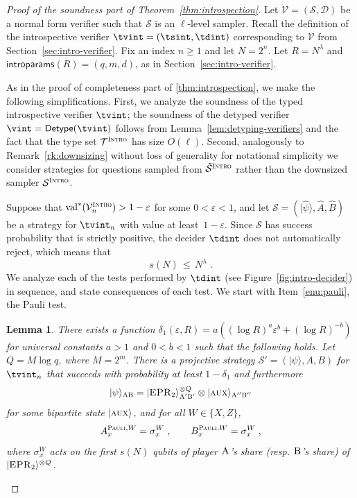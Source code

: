 \documentclass[11pt]{article}
\newtheorem{lemma}[theorem]{Lemma}
\theoremstyle{definition}
\newcommand{\ket}[1]{|#1\rangle}
\newcommand{\val}{\ensuremath{\mathrm{val}}}
\newcommand{\eps}{\varepsilon}
\newcommand{\sampler}{\mathcal{S}}
\newcommand{\decider}{\mathcal{D}}
\newcommand{\verifier}{\mathcal{V}}
\newcommand{\strategy}{\mathscr{S}}
\newcommand{\type}{\mathcal{T}}
\newcommand{\gamestyle}[1]{\ensuremath{\textsc{#1}}\xspace}
\newcommand{\intro}{\gamestyle{Intro}}
\newcommand{\labelstyle}[1]{\ensuremath{\textsc{#1}}\xspace}
\newcommand{\EPR}{\labelstyle{EPR}}
\newcommand{\aux}{\labelstyle{aux}}
\newcommand{\alice}{\labelstyle{A}}
\newcommand{\bob}{\labelstyle{B}}
\newcommand{\typestyle}[1]{\ensuremath{\textsc{#1}}\xspace}
\newcommand{\Pauli}{\typestyle{Pauli}}
\newcommand{\introparams}{\mathsf{introparams}}
\newcommand{\tmstyle}[1]{\ensuremath{\mathsf{#1}}}
\newcommand{\detype}{\tmstyle{Detype}}
\begin{document}
\begin{proof}[Proof of the soundness part of Theorem~\ref{thm:introspection}]
  Let $\verifier=(\sampler, \decider)$ be a normal form verifier such that
  $\sampler$ is an $\ell$-level sampler.
  Recall the definition of the introspective verifier $\tvint =
  (\tsint, \tdint)$ corresponding to $\verifier$ from
  Section~\ref{sec:intro-verifier}.
  Fix an index $n\geq 1$ and let $N = 2^n$.
  Let $R = N^\lambda$ and $\introparams(R) = (q,m,d)$,
  as in Section~\ref{sec:intro-verifier}.
 
  As in the proof of completeness part of \cref{thm:introspection}, we make the
  following simplifications.
  First, we analyze the soundness of the typed introspective verifier
  $\tvint$; the soundness of the detyped verifier
  $\vint = \detype(\tvint)$ follows from Lemma~\ref{lem:detyping-verifiers}
  and the fact that the type set $\type^\intro$ has size $O(\ell)$.
  Second, analogously to Remark~\ref{rk:downsizing} without loss of generality
  for notational simplicity we consider strategies for questions sampled from
  $\tilde{\sampler}^\intro$ rather than the downsized sampler
  ${\sampler}^\intro$.

  Suppose that $\val^*(\verifier_n^\intro) > 1-\eps$ for some $0 < \eps < 1$,
  and let $\strategy = (\ket{\hat{\psi}}, \hat{A}, \hat{B})$ be a strategy for
  $\tvint_n$ with value at least~$1-\eps$.
  Since $\strategy$ has success probability that is strictly positive, the
  decider $\tdint$ does not automatically reject, which means that
	\begin{equation}\label{eq:intro-sound-lambda}
	s(N) \,\leq\, N^\lambda\;.
	\end{equation}
	We analyze each of the tests performed by $\tdint$ (see
  Figure~\ref{fig:intro-decider}) in sequence, and state consequences of each
  test.
  We start with Item~\ref{enu:pauli}, the Pauli test.
	
  \begin{lemma}\label{lem:intro-pauli-strat}
    There exists a function $\delta_1(\eps,R) = a( (\log R)^a \eps^{b} + (\log R)^{-b})$ for universal constants $a > 1$ and $0 < b < 1$ such that the following holds.
    Let $Q = M \log q$, where $M=2^m$.
    There is a projective strategy $\strategy'=(\ket{\psi},A,B)$ for
    $\tvint_n$ that succeeds with probability at least $1-\delta_1$
    and furthermore
    \begin{equation}
      \label{eq:intro-state-a}
      \ket{\psi}_{\alice\bob} =  \ket{\EPR_2}_{\alice'\bob'}^{\otimes Q} \otimes
      \ket{\aux}_{\alice''\bob''}
    \end{equation}
    for some  bipartite state $\ket{\aux}$, and for all $W\in\{X,Z\}$,
    \begin{equation}\label{eq:intro-sound-paulia}
      A^{\Pauli,W}_x = \sigma^W_x \;,\qquad B^{\Pauli,W}_x = \sigma^W_x \;,
    \end{equation}
    where $\sigma^W_x$ acts on the first $s(N)$ qubits of player $\alice$'s
    share (resp.
    $\bob$'s share) of $\ket{\EPR_2}^{\otimes Q}$.
  \end{lemma}
	

\end{proof}
\end{document}
